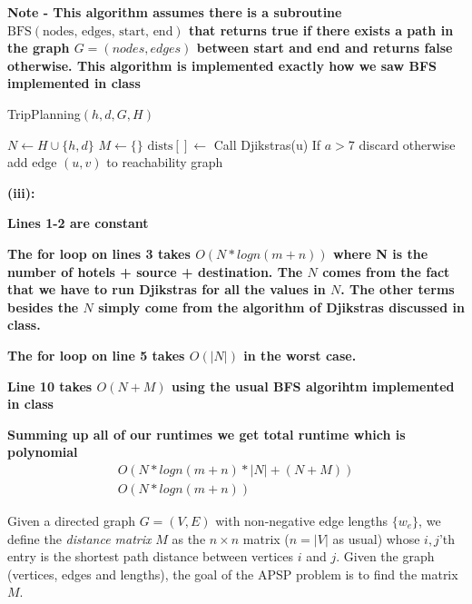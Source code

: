 \documentclass[addpoints]{exam}
\def\mysolution#1{}    %
\begin{document}
\begin{questions}
\textbf{Note - This algorithm assumes there is a subroutine $\text{BFS}(\text{nodes, edges, start, end})$ that returns true if there exists a path in the graph $G=(nodes, edges)$ between start and end and returns false otherwise. This algorithm is implemented exactly how we saw BFS implemented in class}

\begin{algorithm}
\caption{TripPlanning$(h,d,G,H)$}\label{alg:cap}
\begin{algorithmic}[1]
\State $N \gets H \cup \{h,d\}$ 
\State $M \gets \{\}$  
\State $\text{dists}[] \gets$ Call Djikstras(u) 
\State If $a > 7$ discard otherwise add edge $(u, v)$ to reachability graph
\EndFor
\EndFor \\
\end{algorithmic}
\end{algorithm}

\textbf{(iii): }

\textbf{Lines 1-2 are constant}

\textbf{The for loop on lines 3 takes $O(N * logn(m+n))$  where N is the number of hotels + source + destination. The $N$ comes from the fact that we have to run Djikstras for all the values in $N$. The other terms besides the $N$ simply come from the algorithm of Djikstras discussed in class.}

\textbf{The for loop on line 5 takes $O(|N|)$ in the worst case.}

\textbf{Line 10 takes $O(N + M)$ using the usual BFS algorihtm implemented in class}

\textbf{Summing up all of our runtimes we get total runtime which is polynomial}
\begin{align*}
O(N * logn(m+n) * |N| + (N + M)) \\
O(N * logn(m+n))
\end{align*}

\mysolution{

}

Given a directed graph $G = (V, E)$ with non-negative edge lengths $\{w_e\}$, we define the {\em distance matrix} $M$ as the $n \times n$ matrix ($n = |V|$ as usual) whose $i,j$'th entry is the shortest path distance between vertices $i$ and $j$. Given the graph (vertices, edges and lengths), the goal of the APSP problem is to find the matrix $M$.


\end{questions}
\end{document}
